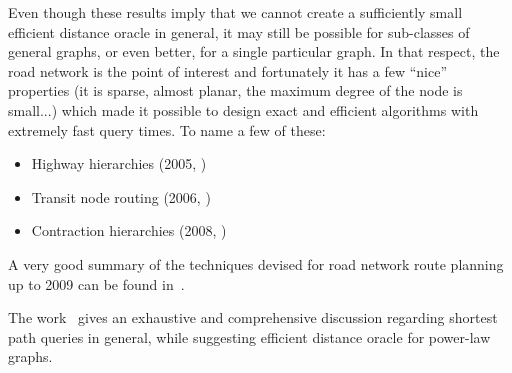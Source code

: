 	\noindent Even though these results imply that we cannot create a sufficiently small efficient distance oracle in general, it may still be possible for sub-classes of general graphs, or even better, for a single particular graph. In that respect, the road network is the point of interest and fortunately it has a few ``nice'' properties (it is sparse, almost planar, the maximum degree of the node is small...) which made it possible to design exact and efficient algorithms with extremely fast query times. To name a few of these:
	\begin{itemize}
		\item Highway hierarchies (2005, \cite{hwhierarchies05})
		\item Transit node routing (2006, \cite{transit06})
		\item Contraction hierarchies (2008, \cite{contracthier08})
	\end{itemize}
	\hspace{\fill}
	
	\noindent A very good summary of the techniques devised for road network route planning up to 2009 can be found in~\cite{engineeringroute09}. 
	
	
	The work~\cite{sommerthesis10} gives an exhaustive and comprehensive discussion regarding shortest path queries in general, while suggesting efficient distance oracle for power-law graphs.